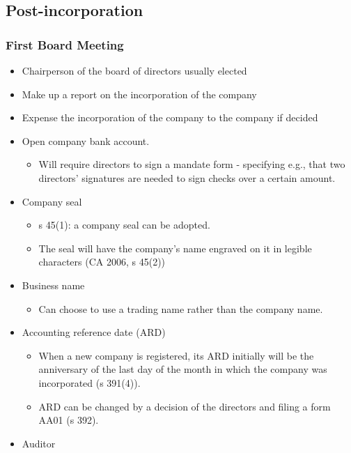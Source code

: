 \documentclass[
]{article}
\providecommand{\tightlist}{%
  \setlength{\itemsep}{0pt}\setlength{\parskip}{0pt}}
\begin{document}
\hypertarget{post-incorporation}{%
\subsection{Post-incorporation}\label{post-incorporation}}

\hypertarget{first-board-meeting}{%
\subsubsection{First Board Meeting}\label{first-board-meeting}}

\begin{itemize}
\tightlist
\item
  Chairperson of the board of directors usually elected
\item
  Make up a report on the incorporation of the company
\item
  Expense the incorporation of the company to the company if decided
\item
  Open company bank account.

  \begin{itemize}
  \tightlist
  \item
    Will require directors to sign a mandate form - specifying e.g.,
    that two directors' signatures are needed to sign checks over a
    certain amount.
  \end{itemize}
\item
  Company seal

  \begin{itemize}
  \tightlist
  \item
    s 45(1): a company seal can be adopted.
  \item
    The seal will have the company's name engraved on it in legible
    characters (CA 2006, s 45(2))
  \end{itemize}
\item
  Business name

  \begin{itemize}
  \tightlist
  \item
    Can choose to use a trading name rather than the company name.
  \end{itemize}
\item
  Accounting reference date (ARD)

  \begin{itemize}
  \tightlist
  \item
    When a new company is registered, its ARD initially will be the
    anniversary of the last day of the month in which the company was
    incorporated (s 391(4)).
  \item
    ARD can be changed by a decision of the directors and filing a form
    AA01 (s 392).
  \end{itemize}
\item
  Auditor


\end{itemize}
\end{document}
